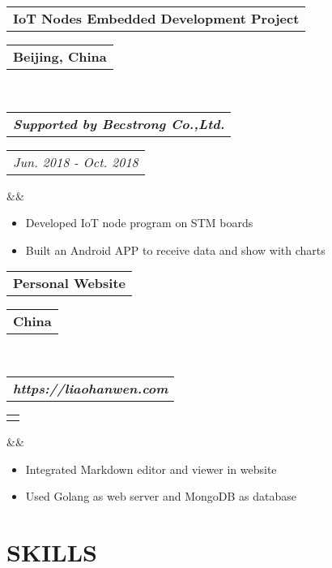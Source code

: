 \documentclass[11pt,a4paper,palatine]{moderncv}        %
\makeatletter
\newcommand*{\customcventry}[7][.25em]{
  \begin{tabular}{@{}l} 
    {\bfseries #4}
  \end{tabular}
  \hfill%
  \begin{tabular}{l@{}}
     {\bfseries #5}
  \end{tabular} \\
  \begin{tabular}{@{}l} 
    {\itshape #3}
  \end{tabular}
  \hfill%
  \begin{tabular}{l@{}}
     {\itshape #2}
  \end{tabular}
  \ifx&#7&%
  \else{\\%
    \begin{minipage}{\maincolumnwidth}%
      \small#7%
    \end{minipage}}\fi%
  \par\addvspace{#1}}
\makeatother
\begin{document}
\begin{CJK*}{UTF8}{gbsn}
\setlength{\parskip}{0.5em}

{\customcventry{Jun. 2018 - Oct. 2018}{\textbf{Supported by Becstrong Co.,Ltd.}}{IoT Nodes Embedded Development Project}{Beijing, China}{}{}}
  {\begin{itemize}
    \item Developed IoT node program on STM boards
    \item Built an Android APP to receive data and show with charts
  \end{itemize}
}

\setlength{\parskip}{0.5em}

{\customcventry{}{\textbf{https://liaohanwen.com}}{Personal Website}{China}{}{}}
  {\begin{itemize}
    \item Integrated Markdown editor and viewer in website
    \item Used Golang as web server and MongoDB as database
  \end{itemize}
}

\section{SKILLS}




\end{CJK*}
\end{document}
